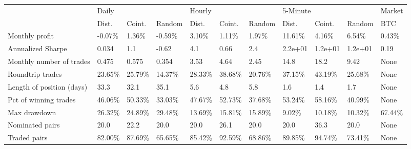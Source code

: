 \begin{tabular}{lllllllllll}
\toprule
{} & \multicolumn{3}{l}{Daily} & \multicolumn{3}{l}{Hourly} & \multicolumn{3}{l}{5-Minute} &   Market \\
{} &    Dist. &   Coint. &   Random &    Dist. &   Coint. &   Random &    Dist. &   Coint. &   Random &      BTC \\
\midrule
Monthly profit            &  -0.07\% &   1.36\% &  -0.59\% &   3.10\% &   1.11\% &   1.97\% &  11.61\% &   4.16\% &   6.54\% &   0.43\% \\
Annualized Sharpe         &    0.034 &      1.1 &    -0.62 &      4.1 &     0.66 &      2.4 &  2.2e+01 &  1.2e+01 &  1.2e+01 &     0.19 \\
Monthly number of trades  &    0.475 &    0.575 &    0.354 &     3.53 &     4.64 &     2.45 &     14.8 &     18.2 &     9.42 &     None \\
Roundtrip trades          &  23.65\% &  25.79\% &  14.37\% &  28.33\% &  38.68\% &  20.76\% &  37.15\% &  43.19\% &  25.68\% &     None \\
Length of position (days) &     33.3 &     32.1 &     35.1 &      5.6 &      4.8 &      5.8 &      1.6 &      1.4 &      1.7 &     None \\
Pct of winning trades     &  46.06\% &  50.33\% &  33.03\% &  47.67\% &  52.73\% &  37.68\% &  53.24\% &  58.16\% &  40.99\% &     None \\
Max drawdown              &  26.32\% &  24.89\% &  29.48\% &  13.69\% &  15.81\% &  15.89\% &   9.02\% &  10.18\% &  10.32\% &  67.44\% \\
Nominated pairs           &     20.0 &     22.2 &     20.0 &     20.0 &     26.1 &     20.0 &     20.0 &     36.3 &     20.0 &     None \\
Traded pairs              &  82.00\% &  87.69\% &  65.65\% &  85.42\% &  92.59\% &  68.86\% &  89.85\% &  94.74\% &  73.41\% &     None \\
\bottomrule
\end{tabular}
